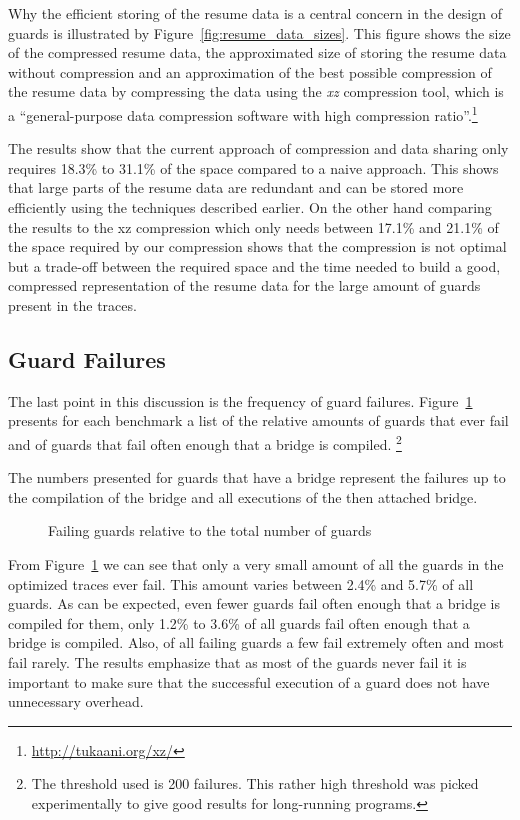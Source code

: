 \documentclass[10pt,preprint]{sigplanconf}
\begin{document}
Why the efficient storing of the resume data is a central concern in the design
of guards is illustrated by Figure~\ref{fig:resume_data_sizes}. This figure shows
the size of the compressed resume data, the approximated size of
storing the resume data without compression and
an approximation of the best possible compression of the resume data by
compressing the data using the
\emph{xz} compression tool, which is a ``general-purpose data compression
software with high compression ratio''.\footnote{\url{http://tukaani.org/xz/}}

The results show that the current approach of compression and data sharing only
requires 18.3\% to 31.1\% of the space compared to a naive approach. This
shows that large parts of the resume data are redundant and can be stored more
efficiently using the techniques described earlier. On the other hand
comparing the results to the xz compression which only needs between 17.1\%
and 21.1\% of the space required by our compression shows that the compression
is not optimal but a trade-off between the required space and the time needed
to build a good, compressed representation of the resume data for the
large amount of guards present in the traces.

\subsection{Guard Failures}
\label{sub:guard_failure}
The last point in this discussion is the frequency of guard failures.
Figure~\ref{fig:failing_guards} presents for each benchmark a list of the
relative amounts of guards that ever fail and of guards that fail often enough that a bridge is compiled.
\footnote{
    The threshold used is 200 failures. This rather high threshold was picked experimentally to give
    good results for long-running programs.
}

The numbers presented for guards that have a bridge represent the
failures up to the compilation of the bridge and all executions of the then
attached bridge.

\begin{figure}
    
    \caption{Failing guards relative to the total number of guards}
    \label{fig:failing_guards}
\end{figure}

From Figure~\ref{fig:failing_guards} we can see that only a very small amount
of all the guards in the optimized traces ever fail. This amount varies between
2.4\% and 5.7\% of all guards. As can be expected, even fewer guards fail often
enough that a bridge is compiled for them, only 1.2\% to 3.6\% of all guards
fail often enough that a bridge is compiled. Also, of all failing guards a few fail extremely often
and most fail rarely. The results emphasize that as most of the guards never
fail it is important to make sure that the successful execution of a guard does
not have unnecessary overhead.
\end{document}
